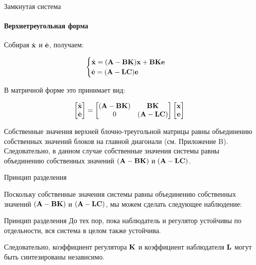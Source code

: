 \documentclass{beamer}
\begin{document}
\begin{frame}{Замкнутая система}
	\framesubtitle{Верхнетреугольная форма}
	\begin{flushleft}
		
		Собирая $\dot {\mathbf{x}}$ и $\dot{\mathbf{e}}$, получаем:
		
		\begin{equation}
			\begin{cases}
				\dot {\mathbf{x}} = (\mathbf{A}-\mathbf{B}\mathbf{K}) \mathbf{x} + \mathbf{B}\mathbf{K}\mathbf{e} \\
				\dot{\mathbf{e}} = 
				(\mathbf{A} - \mathbf{L}\mathbf{C})\mathbf{e}
			\end{cases}
		\end{equation}
		
		В матричной форме это принимает вид:
		
		\begin{equation}
			\begin{bmatrix}
				\dot {\mathbf{x}} \\
				\dot{\mathbf{e}}
			\end{bmatrix}
			=
			\begin{bmatrix}
				(\mathbf{A}-\mathbf{B}\mathbf{K}) & \mathbf{B}\mathbf{K} \\
				0 & (\mathbf{A} - \mathbf{L}\mathbf{C})
			\end{bmatrix}
			\begin{bmatrix}
				\mathbf{x} \\
				\mathbf{e}
			\end{bmatrix}
		\end{equation}
		
		Собственные значения верхней блочно-треугольной матрицы равны объединению собственных значений блоков на главной диагонали (см. Приложение B). Следовательно, в данном случае собственные значения системы равны объединению собственных значений $(\mathbf{A}-\mathbf{B}\mathbf{K})$ и $(\mathbf{A} - \mathbf{L}\mathbf{C})$.
		
	\end{flushleft}
\end{frame}

\begin{frame}{Принцип разделения}
	\begin{flushleft}
		
		Поскольку собственные значения системы равны объединению собственных значений $(\mathbf{A}-\mathbf{B}\mathbf{K})$ и $(\mathbf{A} - \mathbf{L}\mathbf{C})$, мы можем сделать следующее наблюдение:
		
		\bigskip
		
		\begin{alertblock}{Принцип разделения}
			До тех пор, пока наблюдатель и регулятор устойчивы по отдельности, вся система в целом также устойчива.
		\end{alertblock}
		
		\bigskip
		
		Следовательно, коэффициент регулятора $\mathbf{K}$ и коэффициент наблюдателя $\mathbf{L}$ могут быть синтезированы независимо.
		
	\end{flushleft}
\end{frame}
\end{document}
